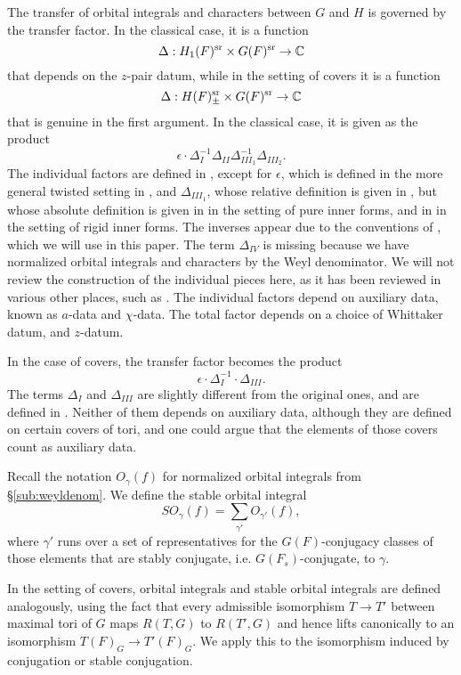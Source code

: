 \documentclass{article}
\theoremstyle{definition}
\numberwithin{equation}{section}
\renewcommand{\-}{\hyp{}}
\begin{document}
The transfer of orbital integrals and characters between $G$ and $H$ is governed by the transfer factor. In the classical case, it is a function
\[ \Delta : H_1(F)^{\textrm{sr}} \times G(F)^{\textrm{sr}} \to \mathbb{C} \]
that depends on the $z$-pair datum, while in the setting of covers it is a function
\[ \Delta : H(F)_\pm^{\textrm{sr}} \times G(F)^{\textrm{sr}} \to \mathbb{C} \]
that is genuine in the first argument. In the classical case, it is given as the product
\[ \epsilon \cdot \Delta_I^{-1}\Delta_{II}\Delta_{III_1}^{-1}\Delta_{III_2}. \]
The individual factors are defined in \cite{LS87}, except for $\epsilon$, which is defined in the more general twisted setting in \cite[\S5.3]{KS99}, and $\Delta_{III_1}$, whose relative definition is given in \cite{LS87}, but whose absolute definition is given in \cite{KalECI} in the setting of pure inner forms, and in \cite{KalRI} in the setting of rigid inner forms. The inverses appear due to the conventions of \cite[(1.0.4)]{KS12}, which we will use in this paper. The term $\Delta_{IV}$ is missing because we have normalized orbital integrals and characters by the Weyl denominator. We will not review the construction of the individual pieces here, as it has been reviewed in various other places, such as \cite[\S3.5,\S4.2,\S4.3]{KalIMS}. The individual factors depend on auxiliary data, known as $a$-data and $\chi$-data. The total factor depends on a choice of Whittaker datum, and $z$-datum.

In the case of covers, the transfer factor becomes the product
\[ \epsilon \cdot \Delta_I^{-1} \cdot \Delta_{III}.\]
The terms $\Delta_I$ and $\Delta_{III}$ are slightly different from the original ones, and are defined in \cite[\S4.3]{KalHDC}. Neither of them depends on auxiliary data, although they are defined on certain covers of tori, and one could argue that the elements of those covers count as auxiliary data.

Recall the notation $O_\gamma(f)$ for normalized orbital integrals from \S\ref{sub:weyldenom}. We define the stable orbital integral
\[ SO_\gamma(f) = \sum_{\gamma'} O_{\gamma'}(f), \]
where $\gamma'$ runs over a set of representatives for the $G(F)$-conjugacy classes of those elements that are stably conjugate, i.e. $G(F_s)$-conjugate, to $\gamma$.

In the setting of covers, orbital integrals and stable orbital integrals are defined analogously, using the fact that every admissible isomorphism $T \to T'$ between maximal tori of $G$ maps $R(T,G)$ to $R(T',G)$ and hence lifts canonically to an isomorphism $T(F)_G \to T'(F)_G$. We apply this to the isomorphism induced by conjugation or stable conjugation. 
\end{document}

